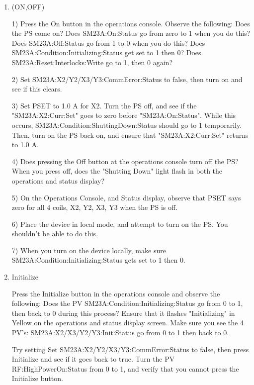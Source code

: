 \documentclass[11pt]{book}		%
\begin{document}
\begin{enumerate}
 
\item (ON,OFF) 

\color{red}
1) Press the On button in the operations console. Observe the following: 
	Does the PS come on? 
	Does SM23A:On:Status go from zero to 1 when you do this? 
	Does SM23A:Off:Status go from 1 to 0 when you do this? 
	Does SM23A:Condition:Initializing:Status get set to 1 then 0?
	Does SM23A:Reset:Interlocks:Write go to 1, then 0 again?

2) Set SM23A:X2/Y2/X3/Y3:CommError:Status to false, then turn on and see if this clears.

3) Set PSET to 1.0 A for X2. Turn the PS off, and see if the "SM23A:X2:Curr:Set" goes to zero before "SM23A:On:Status". While this occurs, SM23A:Condition:ShuttingDown:Status should go to 1 temporarily. Then, turn on the PS back on, and ensure that "SM23A:X2:Curr:Set" returns to 1.0 A.

4) Does pressing the Off button at the operations console turn off the PS? When you press off, does the "Shutting Down" light flash in both the operations and status display?

5) On the Operations Console, and Status display, observe that PSET says zero for all 4 coils, X2, Y2, X3, Y3 when the PS is off.

6) Place the device in local mode, and attempt to turn on the PS. You shouldn't be able to do this.

7) When you turn on the device locally, make sure SM23A:Condition:Initializing:Status gets set to 1 then 0.


\color{black}

 \item Initialize

\color{red}

Press the Initialize button in the operations console and observe the following: 
	Does the PV SM23A:Condition:Initializing:Status go from 0 to 1, then back to 0 during this process? 
	Ensure that it flashes "Initializing" in Yellow on the operations and status display screen. 
	Make sure you see the 4 PV's: SM23A:X2/X3/Y2/Y3:Init:Status go from 0 to 1 then back to 0.

Try setting Set SM23A:X2/Y2/X3/Y3:CommError:Status to false, then press Initialize and see if it goes back to true.
Turn the PV RF:HighPowerOn:Status from 0 to 1, and verify that you cannot press the Initialize button. 


\end{enumerate}
\end{document}
